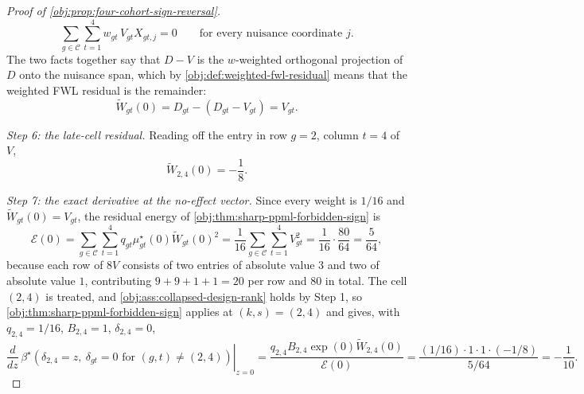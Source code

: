 \begin{proof}[Proof of \cref{obj:prop:four-cohort-sign-reversal}]
\[
\sum_{g\in\mathcal C}\sum_{t=1}^4 w_{gt}\,V_{gt}X_{gt,j}=0
\qquad\text{for every nuisance coordinate }j .
\]
The two facts together say that \(D-V\) is the \(w\)-weighted orthogonal projection of \(D\) onto the nuisance span, which by \cref{obj:def:weighted-fwl-residual} means that the weighted FWL residual is the remainder:
\[
\widetilde W_{gt}(0)=D_{gt}-(D_{gt}-V_{gt})=V_{gt}.
\]

\textit{Step 6: the late-cell residual.} Reading off the entry in row \(g=2\), column \(t=4\) of \(V\),
\[
\widetilde W_{2,4}(0)=-\frac18 .
\]

\textit{Step 7: the exact derivative at the no-effect vector.} Since every weight is \(1/16\) and \(\widetilde W_{gt}(0)=V_{gt}\), the residual energy of \cref{obj:thm:sharp-ppml-forbidden-sign} is
\[
\mathcal E(0)
=
\sum_{g\in\mathcal C}\sum_{t=1}^4 q_{gt}\mu^\star_{gt}(0)\widetilde W_{gt}(0)^2
=
\frac{1}{16}\sum_{g\in\mathcal C}\sum_{t=1}^4V_{gt}^2
=
\frac{1}{16}\cdot\frac{80}{64}
=
\frac{5}{64},
\]
because each row of \(8V\) consists of two entries of absolute value \(3\) and two of absolute value \(1\), contributing \(9+9+1+1=20\) per row and \(80\) in total.
The cell \((2,4)\) is treated, and \cref{obj:ass:collapsed-design-rank} holds by Step 1, so \cref{obj:thm:sharp-ppml-forbidden-sign} applies at \((k,s)=(2,4)\) and gives, with \(q_{2,4}=1/16\), \(B_{2,4}=1\), \(\delta_{2,4}=0\),
\[
\left.\frac{d}{dz}\,
\beta^\star\!\left(\delta_{2,4}=z,\ \delta_{gt}=0\text{ for }(g,t)\neq(2,4)\right)
\right|_{z=0}
=
\frac{q_{2,4}B_{2,4}\exp(0)\widetilde W_{2,4}(0)}{\mathcal E(0)}
=
\frac{(1/16)\cdot1\cdot1\cdot(-1/8)}{5/64}
=
-\frac{1}{10}.
\]


\end{proof}
